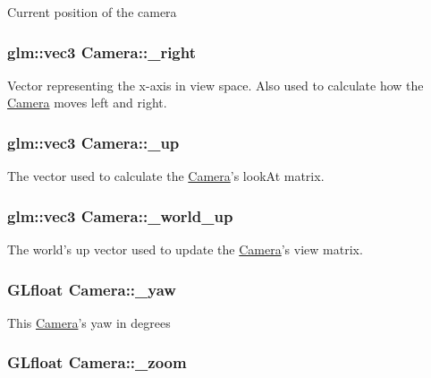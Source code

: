 Current position of the camera \hypertarget{classCamera_a4c556280ed181d8589c28eec7ebebb49}{
\subsubsection[{\-\_\-right}]{\setlength{\rightskip}{0pt plus 5cm}glm\-::vec3 Camera\-::\-\_\-right}}\label{classCamera_a4c556280ed181d8589c28eec7ebebb49}
Vector representing the x-\/axis in view space. Also used to calculate how the \hyperlink{classCamera}{Camera} moves left and right. \hypertarget{classCamera_a323a698e4c5773ee3ec380851b145e2d}{
\subsubsection[{\-\_\-up}]{\setlength{\rightskip}{0pt plus 5cm}glm\-::vec3 Camera\-::\-\_\-up}}\label{classCamera_a323a698e4c5773ee3ec380851b145e2d}
The vector used to calculate the \hyperlink{classCamera}{Camera}'s look\-At matrix. \hypertarget{classCamera_aa5d721a01ba1cb41eafb02e39ea29e03}{
\subsubsection[{\-\_\-world\-\_\-up}]{\setlength{\rightskip}{0pt plus 5cm}glm\-::vec3 Camera\-::\-\_\-world\-\_\-up}}\label{classCamera_aa5d721a01ba1cb41eafb02e39ea29e03}
The world's up vector used to update the \hyperlink{classCamera}{Camera}'s view matrix. \hypertarget{classCamera_ab815461cc043db1f5810c2f488641740}{
\subsubsection[{\-\_\-yaw}]{\setlength{\rightskip}{0pt plus 5cm}G\-Lfloat Camera\-::\-\_\-yaw}}\label{classCamera_ab815461cc043db1f5810c2f488641740}
This \hyperlink{classCamera}{Camera}'s yaw in degrees \hypertarget{classCamera_a99dc4d95f58be2427ff6c8d93c676ecd}{
\subsubsection[{\-\_\-zoom}]{\setlength{\rightskip}{0pt plus 5cm}G\-Lfloat Camera\-::\-\_\-zoom}}\label{classCamera_a99dc4d95f58be2427ff6c8d93c676ecd}
